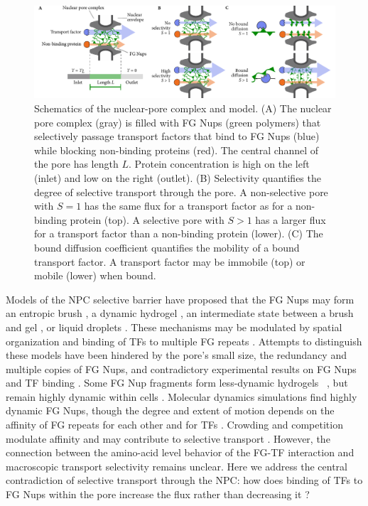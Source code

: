 \begin{figure}[t!]
\centering
\includegraphics[width=17.8cm]{figs/ch02/fig1.pdf}
\caption{Schematics of the nuclear-pore complex and model. (A) The
  nuclear pore complex (gray) is filled with FG Nups (green polymers)
  that selectively passage transport factors that bind to FG Nups
  (blue) while blocking non-binding proteins (red). The central
  channel of the pore has length $L$. Protein concentration is high on
  the left (inlet) and low on the right (outlet).  (B) Selectivity
  quantifies the degree of selective transport through the pore. A
  non-selective pore with $S=1$ has the same flux for a transport
  factor as for a non-binding protein (top). A selective pore with
  $S>1$ has a larger flux for a transport factor than a non-binding
  protein (lower). (C) The bound diffusion coefficient quantifies the
  mobility of a bound transport factor.  A transport factor may be
  immobile (top) or mobile (lower) when bound. }
\label{fig:cartoon}
\end{figure}

Models of the NPC selective barrier have proposed that the FG Nups may
form an entropic brush \cite{rout00}, a dynamic hydrogel
\cite{ribbeck01, frey07}, an intermediate state between a brush and
gel \cite{vovk16}, or liquid droplets \cite{schmidt15}.  These
mechanisms may be modulated by spatial organization \cite{yamada10,
  ando14} and binding of TFs to multiple FG repeats \cite{lowe15,
  schoch12}.  Attempts to distinguish these models have been hindered
by the pore's small size, the redundancy and multiple copies of FG
Nups, and contradictory experimental results on FG Nups and TF binding
\cite{vovk16}. Some FG Nup fragments form less-dynamic hydrogels
\vitro\ \cite{frey07}, but remain highly dynamic within cells
\cite{hough15}. Molecular dynamics simulations find highly dynamic FG
Nups, though the degree and extent of motion depends on the affinity
of FG repeats for each other and for TFs \cite{pulupa17,
  vovk16}. Crowding and competition modulate affinity
\cite{tetenbaum-novatt10} and may contribute to selective transport
\cite{zilman07}.  However, the connection between the amino-acid level
behavior of the FG-TF interaction and macroscopic transport
selectivity remains unclear.  Here we address the central
contradiction of selective transport through the NPC: how does binding
of TFs to FG Nups within the pore increase the flux rather than
decreasing it \cite{bickel02, witten17}?

